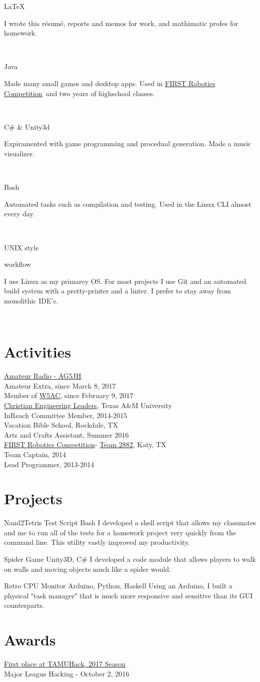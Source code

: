 \documentclass{article}
\newcommand{\jskill}[2]{

\begin{minipage}[t]{.15\textwidth}
\hfill #1
\end{minipage}
\hfill\vline\hfill
\begin{minipage}[t]{.80\textwidth}
#2
\end{minipage}\\\vspace{.1em}}
\newcommand{\frc}{\href{https://www.firstinspires.org/robotics/frc}{FIRST Robotics Competition}}
\newcommand{\frct}{\href{https://www.thebluealliance.com/team/2882}{Team 2882}}
\begin{document}
\jskill{\LaTeX}{I wrote this r\'esum\'e, reports and memos for work, and mathimatic profes for homework.}

\jskill{Java}{Made many small games and desktop apps. Used in \frc\ and two years of highschool classes.}

\jskill{C\# \& Unity3d}{Expiramented with game programming and procedual generation. Made a music visualizer.}

\jskill{Bash}{Automated tasks such as compilation and testing. Used in the Linux CLI almost every day.}

\jskill{UNIX style 

\hfill workflow}{I use Linux as my primarey OS. For most projects I use Git and an automated build system with a pretty-printer and a linter. I prefer to stay away from monolithic IDE's.}

\section{Activities}

\noindent
\href{https://www.qrz.com/db/AG5JH}{Amateur Radio - AG5JH} \\
Amateur Extra, since March 8, 2017 \\
Member of \href{http://w5ac.tamu.edu}{W5AC}, since February 9, 2017 \\
\href{http://www.celtamu.com/}{Christian Engineering Leaders}, Texas A\&M University \\
InReach Committee Member, 2014-2015 \\
Vacation Bible School, Rockdale, TX \\
Arts and Crafts Assistant, Summer 2016 \\
\frc - \frct, Katy, TX \\
Team Captain, 2014 \\
Lead Programmer, 2013-2014

\section{Projects}

Nand2Tetris Test Script Bash
I developed a shell script that allows my classmates and me to run all of the tests for a homework project very quickly from the command line. This utility vastly improved my productivity.

Spider Game Unity3D, C\#
I developed a code module that allows players to walk on walls and moving objects much like a spider would.

Retro CPU Monitor Arduino, Python, Haskell
Using an Arduino, I built a physical "task manager" that is much more responsive and sensitive than its GUI counterparts.

\section{Awards}

\noindent
\href{https://devpost.com/software/midas-evi574}{First place at TAMUHack, 2017 Season} \\
Major League Hacking - October 2, 2016
\end{document}
